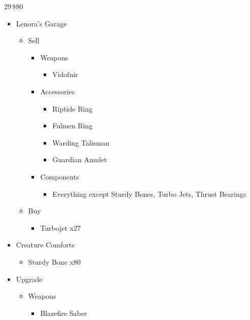 \begin{multicols}{2}
\begin{shop}{29\,880}
\begin{itemize}
    \item Lenora's Garage
    \begin{itemize}
        \item Sell
        \begin{itemize}
            \item Weapons
            \begin{itemize}
                \item Vidofnir
            \end{itemize}
            \item Accessories
            \begin{itemize}
                \item Riptide Ring
                \item Fulmen Ring
                \item Warding Talisman
                \item Guardian Amulet
            \end{itemize}
            \item Components
            \begin{itemize}
                \item Everything except Sturdy Bones, Turbo Jets, Thrust Bearings
            \end{itemize}
        \end{itemize}
        \item Buy
        \begin{itemize}
            \item Turbojet x27
        \end{itemize}
    \end{itemize}
    \item Creature Comforts
    \begin{itemize}
        \item Sturdy Bone x80
    \end{itemize}
\end{itemize}
\end{shop}
\vfill
\begin{upgrade}
\begin{itemize}
    \item Upgrade
    \begin{itemize}
        \item Weapons
        \begin{itemize}
            \item Blazefire Saber

\end{itemize}
\end{itemize}
\end{itemize}
\end{upgrade}
\end{multicols}
